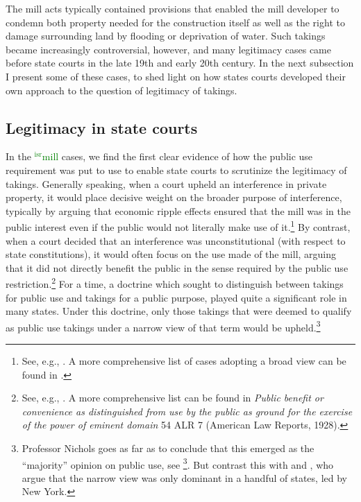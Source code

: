 \documentclass[12pt,a4paper]{book} %
\newcommand{\isr}[1]{\textcolor{green}{$^{\textrm{isr}}${#1}}}
\begin{document}
The mill acts typically contained provisions that enabled the mill developer to condemn both property needed for the construction itself as well as the right to damage surrounding land by flooding or deprivation of water. Such takings became increasingly controversial, however, and many legitimacy cases came before state courts in the late 19th and early 20th century. In the next subsection I present some of these cases, to shed light on how states courts developed their own approach to the question of legitimacy of takings.

\subsection{Legitimacy in state courts}\label{subsec:state}

In the \isr{mill} cases, we find the first clear evidence of how the public use requirement was put to use to enable state courts to scrutinize the legitimacy of takings. Generally speaking, when a court upheld an interference in private property, it would place decisive weight on the broader purpose of interference, typically by arguing that economic ripple effects ensured that the mill was in the public interest even if the public would not literally make use of it.\footnote{See, e.g., \cite{hazen53,scudder32,boston32}. A more comprehensive list of cases adopting a broad view can be found in \cite[617]{nichols40}.} By contrast, when a court decided that an interference was unconstitutional (with respect to state constitutions), it would often focus on the use made of the mill, arguing that it did not directly benefit the public in the sense required by the public use restriction.\footnote{See, e.g., \cite{sadler59,ryerson77,gaylord03,minn06}. A more comprehensive list can be found in {\it Public benefit or convenience as distinguished from use by the public as ground for the exercise of the power of eminent domain} 54 ALR 7 (American Law Reports, 1928).} For a time, a doctrine which sought to distinguish between takings for public use and takings for a public purpose, played quite a significant role in many states. Under this doctrine, only those takings that were deemed to qualify as public use takings under a narrow view of that term would be upheld.\footnote{Professor Nichols goes as far as to conclude that this emerged as the ``majority'' opinion on public use, see \footcite[617-618]{nichols40}. But contrast this with \cite{berger78} and \cite[24]{meidinger80}, who argue that the narrow view was only dominant in a handful of states, led by New York.}
\end{document}
